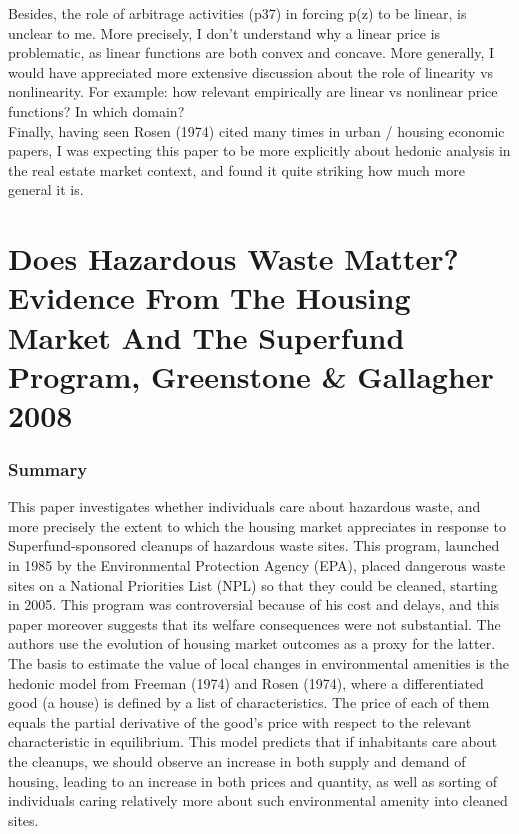 \documentclass[12pt, final]{article}
\begin{document}
Besides, the role of arbitrage activities (p37) in forcing p(z) to be linear, is unclear to me. More precisely, I don’t understand why a linear price is problematic, as linear functions are both convex and concave. More generally, I would have appreciated more extensive discussion about the role of linearity vs nonlinearity. For example: how relevant empirically are linear vs nonlinear price functions? In which domain?
\\

Finally, having seen Rosen (1974) cited many times in urban / housing economic papers, I was expecting this paper to be more explicitly about hedonic analysis in the real estate market context, and found it quite striking how much more general it is.



\newpage

\section*{Does Hazardous Waste Matter? Evidence From The Housing Market And The Superfund Program, Greenstone \& Gallagher 2008} %
\label{sec:does_hazardous_waste_matter_evidence_from_the_housing_market_and_the_superfund_program_greenstone_&_gallagher_2008}




\subsubsection*{Summary} %
\label{ssub:summary}

This paper investigates whether individuals care about hazardous waste, and more precisely the extent to which the housing market appreciates in response to Superfund-sponsored cleanups of hazardous waste sites. This program, launched in 1985 by the Environmental Protection Agency (EPA), placed dangerous waste sites on a National Priorities List (NPL) so that they could be cleaned, starting in 2005. This program was controversial because of his cost and delays, and this paper moreover suggests that its welfare consequences were not substantial. The authors use the evolution of housing market outcomes as a proxy for the latter.
\\

The basis to estimate the value of local changes in environmental amenities is the hedonic model from Freeman (1974) and Rosen (1974), where a differentiated good (a house) is defined by a list of characteristics. The price of each of them equals the partial derivative of the good’s price with respect to the relevant characteristic in equilibrium. This model predicts that if inhabitants care about the cleanups, we should observe an increase in both supply and demand of housing, leading to an increase in both prices and quantity, as well as sorting of individuals caring relatively more about such environmental amenity into cleaned sites.
\\
\end{document}

